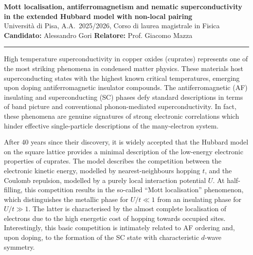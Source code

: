 \documentclass[a4paper]{memoir}
\begin{document}
	

\begin{center}
    {\bfseries {\Large Mott localisation, antiferromagnetism and nematic superconductivity}} \\[0.8em]
    {\bfseries {\Large in the extended Hubbard model with non-local pairing}} \\[1em]
    Università di Pisa, A.A.~2025/2026, 
    Corso di laurea magistrale in Fisica \\[0.8em]
    \textbf{Candidato:} Alessandro Gori
    \hfill
    \textbf{Relatore:} Prof. Giacomo Mazza \\[0.8em]
    \hrule 
    
\end{center}

High temperature superconductivity in copper oxides (cuprates) represents one of the most striking phenomena in condensed matter physics. These materials host superconducting states with the highest known critical temperatures, emerging upon doping antiferromagnetic insulator compounds. The antiferromagnetic (AF) insulating and superconducting (SC) phases defy standard descriptions in terms of band picture and conventional phonon-mediated superconductivity. In fact, these phenomena are genuine signatures of strong electronic correlations which hinder effective single-particle descriptions of the many-electron system.

After 40 years since their discovery, it is widely accepted that the Hubbard model on the square lattice provides a minimal description of the low-energy electronic properties of cuprates. The model describes the competition between the electronic kinetic energy, modelled by nearest-neighbours hopping $t$, and the Coulomb repulsion, modelled by a purely local interaction potential $U$. At half-filling, this competition results in the so-called ``Mott localisation'' phenomenon, which distinguishes the metallic phase for $U/t \ll 1$ from an insulating phase for $U/t \gg 1$. The latter is characterised by the almost complete localisation of electrons due to the high energetic cost of hopping towards occupied sites. Interestingly, this basic competition is intimately related to AF ordering and, upon doping, to the formation of the SC state with characteristic $d$-wave symmetry.
\end{document}
